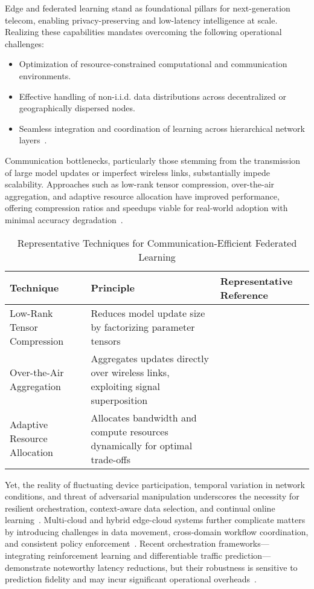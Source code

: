 \documentclass[sigconf]{acmart}
\begin{document}
Edge and federated learning stand as foundational pillars for next-generation telecom, enabling privacy-preserving and low-latency intelligence at scale. Realizing these capabilities mandates overcoming the following operational challenges:
\begin{itemize}
    \item Optimization of resource-constrained computational and communication environments.
    \item Effective handling of non-i.i.d. data distributions across decentralized or geographically dispersed nodes.
    \item Seamless integration and coordination of learning across hierarchical network layers~\cite{ref17,ref19,ref23,ref25,ref26,ref39,ref42,ref48}.
\end{itemize}

Communication bottlenecks, particularly those stemming from the transmission of large model updates or imperfect wireless links, substantially impede scalability. Approaches such as low-rank tensor compression, over-the-air aggregation, and adaptive resource allocation have improved performance, offering compression ratios and speedups viable for real-world adoption with minimal accuracy degradation~\cite{ref39,ref42,ref48}. 

\begin{table*}[htbp]
\centering
\caption{Representative Techniques for Communication-Efficient Federated Learning}
\label{tab:fed_techniques}
\begin{adjustbox}{max width=\textwidth}
\begin{tabular}{lll}
\toprule
\textbf{Technique} & \textbf{Principle} & \textbf{Representative Reference} \\
\midrule
Low-Rank Tensor Compression & Reduces model update size by factorizing parameter tensors & \cite{ref39} \\
Over-the-Air Aggregation    & Aggregates updates directly over wireless links, exploiting signal superposition & \cite{ref42} \\
Adaptive Resource Allocation & Allocates bandwidth and compute resources dynamically for optimal trade-offs & \cite{ref48} \\
\bottomrule
\end{tabular}
\end{adjustbox}
\end{table*}

Yet, the reality of fluctuating device participation, temporal variation in network conditions, and threat of adversarial manipulation underscores the necessity for resilient orchestration, context-aware data selection, and continual online learning~\cite{ref25,ref39}. Multi-cloud and hybrid edge-cloud systems further complicate matters by introducing challenges in data movement, cross-domain workflow coordination, and consistent policy enforcement~\cite{ref26,ref48}. Recent orchestration frameworks—integrating reinforcement learning and differentiable traffic prediction—demonstrate noteworthy latency reductions, but their robustness is sensitive to prediction fidelity and may incur significant operational overheads~\cite{ref42}.
\end{document}
